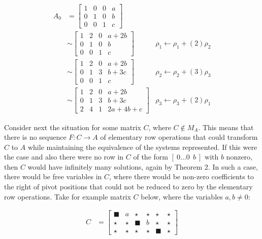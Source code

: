 \documentclass[10pt,letterpaper,final]{report}
\begin{document}
\begin{align*}
  A_0 & =
  \left[\begin{array}{rrr|r}
      1 & 0 & 0 & a \\
      0 & 1 & 0 & b \\
      0 & 0 & 1 & c
    \end{array}\right]
  \\[6pt]
      & \sim
  \left[\begin{array}{rrr|r}
      1 & 2 & 0 & a + 2b \\
      0 & 1 & 0 & b      \\
      0 & 0 & 1 & c
    \end{array}\right]
      & \rho_1 \leftarrow \rho_1 + (2)\rho_2
  \\[6pt]
      & \sim
  \left[\begin{array}{rrr|r}
      1 & 2 & 0 & a + 2b \\
      0 & 1 & 3 & b + 3c \\
      0 & 0 & 1 & c
    \end{array}\right]
      & \rho_2 \leftarrow \rho_2 + (3)\rho_3
  \\[6pt]
      & \sim
  \left[\begin{array}{rrr|r}
      1 & 2 & 0 & a + 2b      \\
      0 & 1 & 3 & b + 3c      \\
      2 & 4 & 1 & 2a + 4b + c
    \end{array}\right]
      & \rho_3 \leftarrow \rho_3 + (2)\rho_1
\end{align*}

Consider next the situation for some matrix $C$, where $C \not\in M_A$. This means that there is no sequence $F: C \to A$ of elementary row operations that could transform $C$ to $A$ while maintaining the equivalence of the systems represented. If this were the case and also there were no row in $C$ of the form $[\ 0 \ldots 0\ \ b\ ] \text{ with $b$ nonzero}$, then $C$ would have infinitely many solutions, again by Theorem 2. In such a case, there would be free variables in $C$, where there would be non-zero coefficients to the right of pivot positions that could not be reduced to zero by the elementary row operations. Take for example matrix $C$ below, where the variables $a,b \ne 0$:

\begin{align*}
  C & =
  \left[\begin{array}{rrrrr|r}
      \blacksquare & a     & \star        & \star & \star        & \star \\
      \star        & \star & \blacksquare & b     & \star        & \star \\
      \star        & \star & \star        & \star & \blacksquare & \star
    \end{array}\right]
\end{align*}
\end{document}
